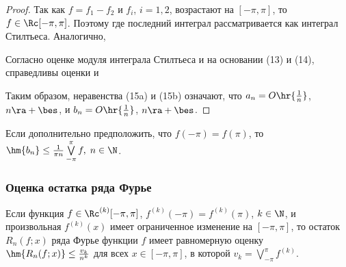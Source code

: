 \documentclass[a4paper]{article}
\begin{document}
\begin{proof}
Так как $f=f_1-f_2$ и $f_i$, $i=1,2$, возрастают на $[-\pi,\pi]$, то
$f\in\Rc[-\pi,\pi]$. Поэтому  где
последний интеграл рассматривается как интеграл Стилтьеса.
Аналогично, 

Согласно оценке модуля интеграла Стилтьеса и на основании (13) и
(14), справедливы оценки  и 

Таким образом, неравенства (15a) и (15b) означают, что $a_n =
O\hr{\frac1n}$, $n\ra+\bes$, и $b_n = O\hr{\frac1n}$, $n\ra+\bes$.
\end{proof}

\begin{note}
Если дополнительно предположить, что $f(-\pi) = f(\pi)$, то
$\hm{b_n} \le \frac1{\pi n} \bigvee\limits_{-\pi}^{\pi} f, \;
n\in\N$.
\end{note}

\subsubsection{Оценка остатка ряда Фурье}

\begin{theorem}
Если функция $f\in\Rc^{(k)} [-\pi,\pi]$, $f^{(k)}(-\pi) =
f^{(k)}(\pi)$, $k\in\N$, и произвольная $f^{(k)}(x)$ имеет
ограниченное изменение на $[-\pi,\pi]$, то остаток $R_n(f;x)$ ряда
Фурье функции $f$ имеет равномерную оценку $\hm{R_n(f;x)} \le
\frac{v_k}{n^k}$ для всех $x\in[-\pi,\pi]$, в которой $v_k =
\bigvee\limits_{-\pi}^{\pi} f^{(k)}$.
\end{theorem}
\end{document}
